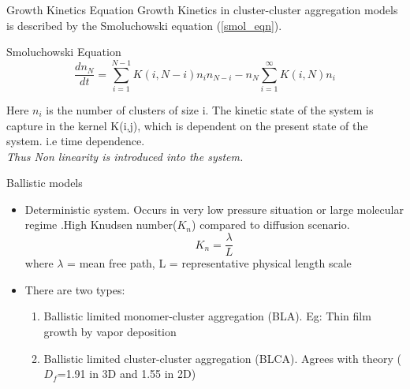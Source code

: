 \documentclass{beamer}
\begin{document}
\begin{frame}{Growth Kinetics Equation}
Growth Kinetics in cluster-cluster aggregation models is described by the Smoluchowski equation (\ref{smol_eqn}).
\begin{block}{Smoluchowski Equation}
    \begin{equation} \label{smol_eqn}
    \frac{dn_N}{dt} = \sum_{i=1}^{N-1} {K(i,N-i) n_i n_{N-i}} - n_N \sum_{i=1}^{\infty} {K(i,N)n_i}
    \end{equation}
\end{block}
Here ${n_i}$ is the number of clusters of size i. The kinetic state of the system is capture in the \alert{kernel K(i,j)}, which is dependent on the present state of the system. i.e \alert{time dependence}.\\ 

\emph{Thus \alert{Non linearity} is introduced into the system.}


\end{frame}


\begin{frame}{Ballistic models}
\begin{itemize}
  \item {\alert{Deterministic} system. Occurs in very low pressure situation or large molecular regime .High Knudsen number($K_n$) compared to diffusion scenario.}
  \begin{equation}
      K_n= \frac{\lambda}{L} 
  \end{equation}
   where $\lambda$ = mean free path, L = representative physical length scale 
      \item {There are two types:}
      \begin{enumerate}
          \item Ballistic limited monomer-cluster aggregation (BLA). Eg: Thin film growth by vapor deposition   
          \item Ballistic limited cluster-cluster aggregation (BLCA). Agrees with theory (\alert{${D_f}$=1.91} in 3D and 1.55 in 2D)
      \end{enumerate}
\end{itemize}     
\end{frame}
\end{document}
